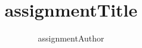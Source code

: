 \documentclass[12pt]{article}
\author{assignmentAuthor}
\title{assignmentTitle}
\begin{document}
\maketitle
\begin{center}
\end{center}
\end{document}
